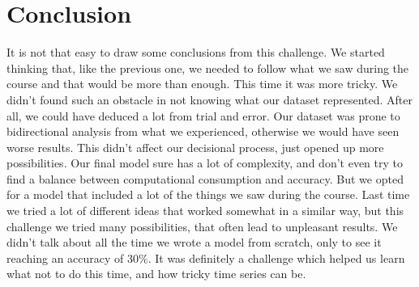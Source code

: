 \documentclass[a4paper,11pt]{article}
\numberwithin{equation}{section}
\begin{document}
\section*{Conclusion}
It is not that easy to draw some conclusions from this challenge. We started thinking that, like the previous one, we needed to follow what we saw during the course and that would be more than enough. This time it was more tricky. We didn't found such an obstacle in not knowing what our dataset represented. After all, we could have deduced a lot from trial and error. Our dataset was prone to bidirectional analysis from what we experienced, otherwise we would have seen worse results. This didn't affect our decisional process, just opened up more possibilities. Our final model sure has a lot of complexity, and don't even try to find a balance between computational consumption and accuracy. But we opted for a model that included a lot of the things we saw during the course. Last time we tried a lot of different ideas that worked somewhat in a similar way, but this challenge we tried many possibilities, that often lead to unpleasant results. We didn't talk about all the time we wrote a model from scratch, only to see it reaching an accuracy of \(30\%\). It was definitely a challenge which helped us learn what not to do this time, and how tricky time series can be.
\end{document}
